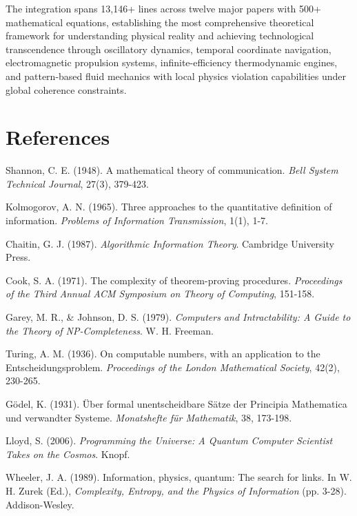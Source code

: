\documentclass[12pt,a4paper]{article}
\begin{document}
The integration spans 13,146+ lines across twelve major papers with 500+ mathematical equations, establishing the most comprehensive theoretical framework for understanding physical reality and achieving technological transcendence through oscillatory dynamics, temporal coordinate navigation, electromagnetic propulsion systems, infinite-efficiency thermodynamic engines, and pattern-based fluid mechanics with local physics violation capabilities under global coherence constraints.

\section{References}



\begin{thebibliography}{99}

Shannon, C. E. (1948). A mathematical theory of communication. \textit{Bell System Technical Journal}, 27(3), 379-423.

Kolmogorov, A. N. (1965). Three approaches to the quantitative definition of information. \textit{Problems of Information Transmission}, 1(1), 1-7.

Chaitin, G. J. (1987). \textit{Algorithmic Information Theory}. Cambridge University Press.

Cook, S. A. (1971). The complexity of theorem-proving procedures. \textit{Proceedings of the Third Annual ACM Symposium on Theory of Computing}, 151-158.

Garey, M. R., \& Johnson, D. S. (1979). \textit{Computers and Intractability: A Guide to the Theory of NP-Completeness}. W. H. Freeman.

Turing, A. M. (1936). On computable numbers, with an application to the Entscheidungsproblem. \textit{Proceedings of the London Mathematical Society}, 42(2), 230-265.

Gödel, K. (1931). Über formal unentscheidbare Sätze der Principia Mathematica und verwandter Systeme. \textit{Monatshefte für Mathematik}, 38, 173-198.

Lloyd, S. (2006). \textit{Programming the Universe: A Quantum Computer Scientist Takes on the Cosmos}. Knopf.

Wheeler, J. A. (1989). Information, physics, quantum: The search for links. In W. H. Zurek (Ed.), \textit{Complexity, Entropy, and the Physics of Information} (pp. 3-28). Addison-Wesley.


\end{thebibliography}
\end{document}
